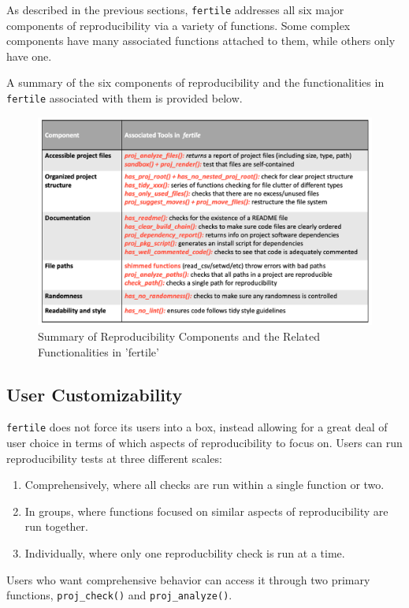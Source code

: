 \documentclass[12pt,twoside]{reedthesis}
\begin{document}
As described in the previous sections, \texttt{fertile} addresses all
six major components of reproducibility via a variety of functions. Some
complex components have many associated functions attached to them,
while others only have one.

A summary of the six components of reproducibility and the
functionalities in \texttt{fertile} associated with them is provided
below.
\begin{figure}
\includegraphics[width=1\linewidth]{figure/components-summary} \caption{Summary of Reproducibility Components and the Related Functionalities in 'fertile'}\label{fig:unnamed-chunk-31}
\end{figure}
\subsection{User Customizability}\label{user-customizability}

\texttt{fertile} does not force its users into a box, instead allowing
for a great deal of user choice in terms of which aspects of
reproducibility to focus on. Users can run reproducibility tests at
three different scales:
\begin{enumerate}
\def\labelenumi{\arabic{enumi})}
\item
  Comprehensively, where all checks are run within a single function or
  two.
\item
  In groups, where functions focused on similar aspects of
  reproducibility are run together.
\item
  Individually, where only one reproducbility check is run at a time.
\end{enumerate}
Users who want comprehensive behavior can access it through two primary
functions, \texttt{proj\_check()} and \texttt{proj\_analyze()}.
\end{document}
